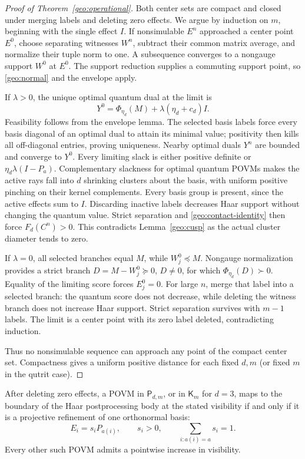 \begin{proof}[Proof of Theorem~\ref{geo:operational}]
Both center sets are compact and closed under merging labels and
deleting zero effects. We argue by induction on \(m\), beginning
with the single effect \(I\).
If nonsimulable \(E^n\) approached a center point \(E^0\), choose
separating witnesses \(W^n\), subtract their common matrix average,
and normalize their tuple norm to one. A subsequence converges to
a nongauge support \(W^0\) at \(E^0\).
The support reduction supplies a commuting support point, so
\eqref{geo:normal} and the envelope apply.

If \(\lambda>0\), the unique optimal quantum dual at the limit is
\[
 Y^0=\Phi_{\eta_d}(M)+\lambda(\eta_d+c_d)I.
\]
Feasibility follows from the envelope lemma. The selected basis
labels force every basis diagonal of an optimal dual to attain its
minimal value; positivity then kills all off-diagonal entries,
proving uniqueness.
Nearby optimal duals \(Y^n\) are bounded and converge to \(Y^0\).
Every limiting slack is either positive definite or
\(\eta_d\lambda(I-P_a)\).
Complementary slackness for optimal quantum POVMs makes the active
rays fall into \(d\) shrinking clusters about the basis, with
uniform positive pinching on their kernel complements. Every basis
group is present, since the active effects sum to \(I\).
Discarding inactive labels decreases Haar support without changing
the quantum value. Strict separation and
\eqref{geo:contact-identity} then force \(F_d(C^n)>0\).
This contradicts Lemma~\ref{geo:cusp} as the actual cluster diameter
tends to zero.

If \(\lambda=0\), all selected branches equal \(M\), while
\(W_j^0\preceq M\). Nongauge normalization provides a strict branch
\(D=M-W_j^0\succeq0\), \(D\ne0\), for which
\(\Phi_{\eta_d}(D)\succ0\). Equality of the limiting score forces
\(E_j^0=0\). For large \(n\), merge that label into a selected branch:
the quantum score does not decrease, while deleting the witness
branch does not increase Haar support. Strict separation survives
with \(m-1\) labels. The limit is a center point with its zero label
deleted, contradicting induction.

Thus no nonsimulable sequence can approach any point of the compact
center set. Compactness gives a uniform positive distance for each
fixed \(d,m\) (or fixed \(m\) in the qutrit case).
\end{proof}

\begin{corollary}
\label{geo:boundary}
After deleting zero effects, a POVM in \(\mathsf P_{d,m}\), or in
\(\mathsf K_m\) for \(d=3\), maps to the boundary of the Haar
postprocessing body at the stated visibility if and only if it is
a projective refinement of one orthonormal basis:
\[
 E_i=s_iP_{a(i)},\qquad s_i>0,\qquad
 \sum_{i:a(i)=a}s_i=1.
\]
Every other such POVM admits a pointwise increase in visibility.
\end{corollary}

